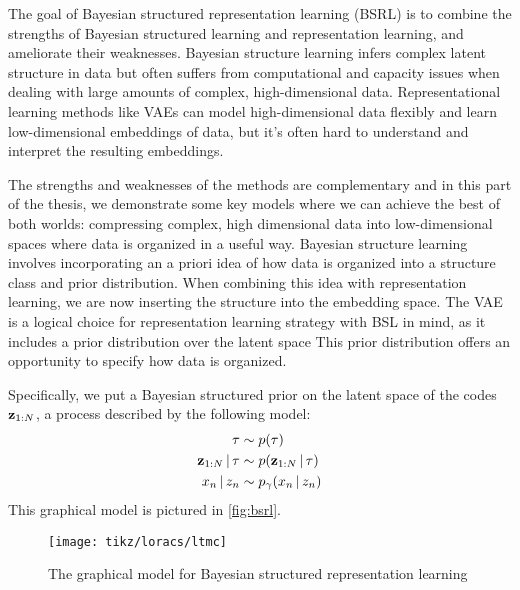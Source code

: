 The goal of Bayesian structured
representation learning (BSRL)
is to combine the
strengths of
Bayesian structured learning
and representation learning,
and ameliorate their weaknesses.
Bayesian structure learning
infers complex latent structure
in data but often suffers from
computational and capacity issues
when dealing with large amounts of
complex, high-dimensional data.
Representational learning methods
like VAEs can model high-dimensional
data flexibly and learn low-dimensional
embeddings of data,
but it's often hard to understand 
and interpret the resulting embeddings.

The strengths and weaknesses of
the methods are complementary
and in this part of the thesis, we demonstrate
some key models where we can
achieve the best of both worlds:
compressing complex, high dimensional
data into low-dimensional spaces
where data is organized in a useful way.
Bayesian structure learning
involves incorporating an a priori
idea of how data is organized
into a structure class and
prior distribution.
When combining this idea with representation
learning, we are now inserting
the structure into the embedding space.
The VAE is a logical choice
for representation learning strategy
with BSL in mind, as it includes
a prior distribution over the latent space
This prior distribution
offers an opportunity to specify
how data is organized.

Specifically, we put a Bayesian structured prior
on the latent space of the codes $\mathbf{z}_{1:N}$,
a process described by the following model:
\begin{align*}
    \tau &\sim p(\tau) \\
    \mathbf{z}_{1:N} \,|\, \tau &\sim p(\mathbf{z}_{1:N} \,|\, \tau) \\
    x_n \,|\, z_n &\sim p_\gamma(x_n \,|\, z_n)
\end{align*}
This graphical model is pictured in 
\autoref{fig:bsrl}.

\begin{figure}[H]
    \centering
    \texttt{[image: tikz/loracs/ltmc]}
    \caption{The graphical model for
    Bayesian structured representation learning}
    \label{fig:bsrl}
\end{figure}

